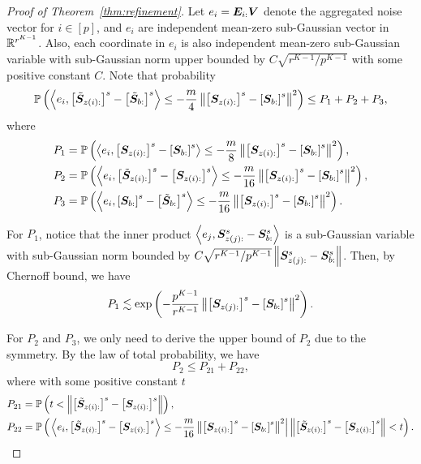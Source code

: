 \documentclass[lettersize,onecolumn,journal]{IEEEtran}
\theoremstyle{definition}
\theoremstyle{definition}
\newcommand{\of}[1]{\left(#1\right)}
\newcommand{\off}[1]{\left[#1\right]}
\newcommand{\ang}[1]{\left\langle#1\right\rangle}
\def\fixme#1#2{\textbf{\color{red}[FIXME (#1): #2]}}
\begin{document}
\begin{proof}[Proof of Theorem~\ref{thm:refinement}]
    Let $e_i = \bm{E}_{i:} \bm{V}$ denote the aggregated noise vector for $i \in [p]$, and $e_i$ are independent mean-zero sub-Gaussian vector in $\mathbb{R}^{r^{K-1}}$. Also, each coordinate in $e_i$ is also independent mean-zero sub-Gaussian variable with sub-Gaussian norm upper bounded by $C\sqrt{r^{K-1}/p^{K-1}}$ with some positive constant $C$.
    Note that probability 
    \begin{align}
        \bbP \of{ \ang{ e_i, \off{  \tilde \mS_{z(i):} }^s - \off{  \tilde \mS_{b:} }^s }  \leq - \frac{ m}{4} \onorm{ \off{ \mS_{z(i):}  }^s - \off{ \mS_{b:}  }^s  }^2} \leq P_1 + P_2 + P_3,
    \end{align}
    where 
    \begin{align}
        P_1 &= \bbP \of{ \ang{e_i, \off{  \mS_{z(i):} }^s - \off{ \mS_{b:} }^s} \leq -\frac{m}{8}  \onorm{ \off{ \mS_{z(i):}  }^s - \off{ \mS_{b:}  }^s  }^2 }, \\
        P_2 &= \bbP \of{ \ang{e_i, \off{ \tilde  \mS_{z(i):} }^s - \off{ \mS_{z(i):} }^s} \leq -\frac{m}{16}  \onorm{ \off{ \mS_{z(i):}  }^s - \off{ \mS_{b:}  }^s  }^2 },\\
        P_3 &= \bbP \of{ \ang{e_i, \off{  \mS_{b:} }^s - \off{\tilde  \mS_{b:} }^s} \leq -\frac{m}{16}   \onorm{ \off{ \mS_{z(i):}  }^s - \off{ \mS_{b:}  }^s  }^2 }.
    \end{align}
    
    For $P_1$, notice that the inner product $\ang{e_j,\mS_{z(j):}^s - \mS_{b:}^s} $ is a sub-Gaussian variable with sub-Gaussian norm bounded by $C \sqrt{ r^{K-1}/ p^{K-1} } \left\lVert \bm S_{z(j):} ^s -  \bm S_{b:}^s \right\rVert$. Then, by Chernoff bound, we have  
    \begin{equation}\label{eq:p1_2}
         P_1 \lesssim \exp \of{  - \frac{p^{K-1}}{r^{K-1}}   \onorm{ \off{ \mS_{z(j):}  }^s - \off{ \mS_{b:}  }^s  }^2 }.
    \end{equation}
    
    For $P_2$ and $P_3$, we only need to derive the upper bound of $P_2$ due to the symmetry. By the law of total probability, we have 
    \begin{equation}\label{eq:p2}
        P_2 \leq P_{21} + P_{22},
    \end{equation}
    where with some positive constant $t$
    \begin{align}
        P_{21}& =  \bbP \of{ t <   \onorm{ \off{ \tilde  \mS_{z(i):} }^s - \off{ \mS_{z(i):} }^s }},\\
        P_{22} &= \bbP \of{ \left. \ang{e_i, \off{ \tilde  \mS_{z(i):} }^s - \off{ \mS_{z(i):} }^s} \leq -\frac{m}{16}  \onorm{ \off{ \mS_{z(i):}  }^s - \off{ \mS_{b:}  }^s  }^2 \right| \onorm{ \off{ \tilde  \mS_{z(i):} }^s - \off{ \mS_{z(i):} }^s } < t  }.
    \end{align}
    

\end{proof}
\end{document}
